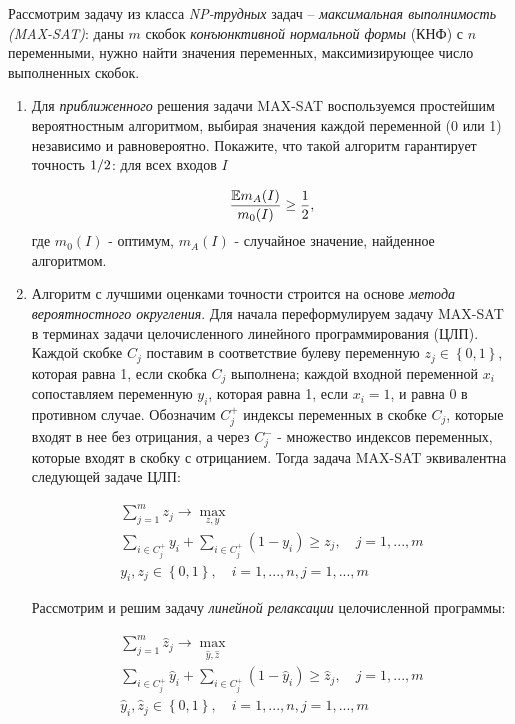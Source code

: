 \begin{problem}
\label{derandom}
Рассмотрим задачу из класса \textit{NP-трудных} задач -- \textit{максимальная выполнимость (MAX-SAT)}: даны $m$ скобок \textit{конъюнктивной нормальной формы }(КНФ) с $n$ переменными, нужно найти значения переменных, максимизирующее число выполненных скобок.

\begin{enumerate}

\item Для \textit{приближенного} решения задачи MAX-SAT воспользуемся простейшим вероятностным алгоритмом, выбирая значения каждой переменной (0 или 1) независимо и равновероятно. Покажите, что такой алгоритм гарантирует точность ${1\mathord{\left/ {\vphantom {1 2}} \right. \kern-\nulldelimiterspace} 2} $: для всех входов $I$

\[\frac{\mathrm{{\mathbb E}} m_{A} (I)}{m_{0} (I)} \ge \frac{1}{2} ,\] 
где $m_{0} (I)$ - оптимум, $m_{A} (I)$ - случайное значение, найденное алгоритмом. 

\item Алгоритм с лучшими оценками точности строится на основе \textit{метода вероятностного округления}. Для начала переформулируем задачу MAX-SAT в терминах задачи целочисленного линейного программирования (ЦЛП). Каждой скобке $C_{j} $ поставим в соответствие булеву переменную $z_{j} \in \left\{0,1\right\}$, которая равна 1, если скобка $C_{j} $ выполнена; каждой входной переменной $x_{i} $ сопоставляем переменную $y_{i} $, которая равна 1, если $x_{i} =1$, и равна 0 в противном случае. Обозначим $C_{j}^{+} $ индексы переменных в скобке $C_{j} $, которые входят в нее без отрицания, а через $C_{j}^{-} $ - множество индексов переменных, которые входят в скобку с отрицанием. Тогда задача MAX-SAT эквивалентна следующей задаче ЦЛП:

\[\begin{array}{l} {\sum _{j=1}^{m}z_{j}  \to \mathop{\max }\limits_{z,y} } \\ {\sum _{i\in C_{j}^{+} }y_{i} +\sum _{i\in C_{j}^{+} }(1-y_{i} )  \ge z_{j} ,\quad j=1,...,m} \\ {y_{i} ,z_{j} \in \left\{0,1\right\},\quad i=1,...,n,j=1,...,m} \end{array}\] 

Рассмотрим и решим задачу \textit{линейной релаксации} целочисленной программы:

\[\begin{array}{l} {\sum _{j=1}^{m}\hat{z}_{j}  \to \mathop{\max }\limits_{\hat{y},\hat{z}} } \\ {\sum _{i\in C_{j}^{+} }\hat{y}_{i} +\sum _{i\in C_{j}^{+} }(1-\hat{y}_{i} )  \ge \hat{z}_{j} ,\quad j=1,...,m} \\ {\hat{y}_{i} ,\hat{z}_{j} \in \left\{0,1\right\},\quad i=1,...,n,j=1,...,m} \end{array}\] 


\end{enumerate}
\end{problem}
